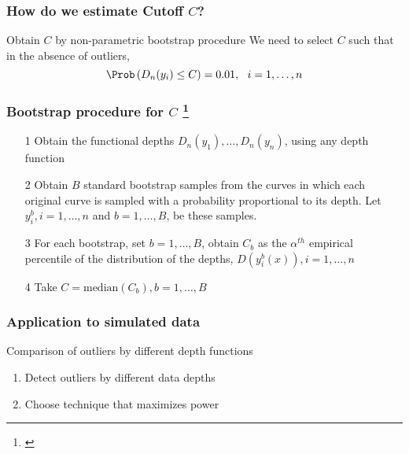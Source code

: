 \documentclass[10pt,dvipsnames,table]{beamer}
\begin{document}
\begin{frame}
\frametitle{How do we estimate Cutoff $C$?}
\Large
\begin{block}{Obtain $C$ by non-parametric bootstrap procedure}
We need to select $C$ such that in the absence of outliers, \[ \Prob\left( D_n(y_i) \leq C\right) = 0.01,\ \ i = 1, \dots, n \]
\end{block}

\end{frame}

\begin{frame}
\frametitle{Bootstrap procedure for $C$ \footnote{\cite{Febrero-Bande_etal_2007_Environmetrics}}}
\begin{enumerate}
\item[1] Obtain the functional depths $D_n(y_1), \dots, D_n(y_n)$, using any depth function
\pause
\item[2] Obtain $B$ standard bootstrap samples from the curves in which each original curve is sampled with a probability proportional to its depth. Let $y_i^b, i = 1, \dots, n$ and $b = 1, \dots, B$, be these samples.
\pause
\item[3] For each bootstrap, set $b = 1, \dots, B$, obtain $C_b$ as the $\alpha^{th}$ empirical percentile of the distribution of the depths, $D(y_i^b(x)), i = 1, \dots, n$
\pause
\item[4] Take $C = \text{median}(C_b), b = 1, \dots, B$ 
\end{enumerate}
\end{frame}

\begin{frame}
\frametitle{Application to simulated data}
\Large
\begin{block}{Comparison of outliers by different depth functions}
\begin{enumerate}
\item Detect outliers by different data depths
\vspace{1cm}
\item Choose technique that maximizes power
\end{enumerate}
\end{block}

\end{frame}
\end{document}
